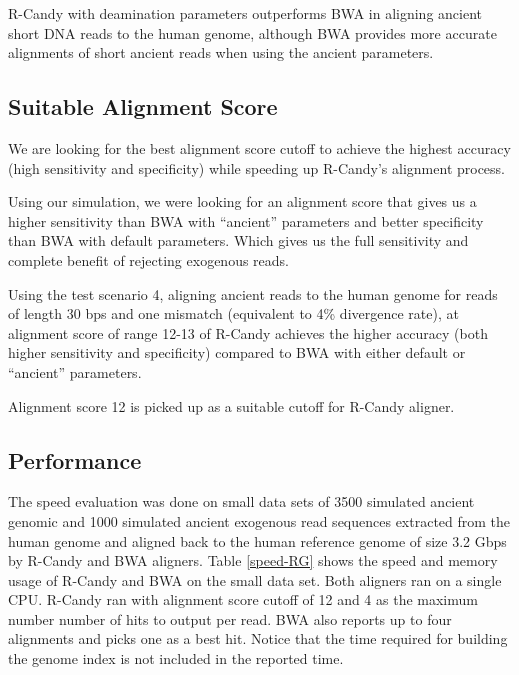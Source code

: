 \documentclass[11pt,a4paper]{report}
\newcommand{\quotes}[1]{``#1''}
\begin{document}
R-Candy with deamination parameters outperforms BWA in aligning ancient short DNA
reads to the human genome, although BWA provides more accurate alignments of short 
ancient reads when using the ancient parameters. 
 



\subsection{Suitable Alignment Score} 
\label{Suitable Alignment Score}

We are looking for the best alignment score cutoff to achieve the 
highest accuracy (high sensitivity and specificity) while speeding 
up R-Candy's alignment process.

Using our simulation, we were looking for an alignment score that 
gives us a higher sensitivity than BWA with \quotes{ancient} parameters 
and better specificity than BWA with default parameters.
Which gives us the full sensitivity and complete benefit of rejecting
exogenous reads. 

Using the test scenario 4, aligning ancient reads to the human
genome for reads of length 30 bps and one mismatch (equivalent to 4\% 
divergence rate), at alignment score of range 12-13 of R-Candy 
achieves the higher accuracy (both higher sensitivity and 
specificity) compared to BWA with either default or \quotes{ancient} 
parameters.

Alignment score 12 is picked up as a suitable cutoff for R-Candy aligner. 


\subsection{Performance} \label{Performance}

The speed evaluation was done on small data sets of 3500 simulated ancient 
genomic and 1000 simulated ancient exogenous read sequences extracted from
the human genome and aligned back to the human reference genome of size 3.2 
Gbps by R-Candy and BWA aligners.
Table \ref{speed-RG} shows the speed and memory usage of R-Candy and BWA on 
the small data set. Both aligners ran on a single CPU. 
R-Candy ran with alignment score cutoff of 12 and 4 as the maximum
number number of hits to output per read. BWA also reports up to four
alignments and picks one as a best hit.  Notice that the time required for
building the genome index is not included in the reported time.\\
\end{document}
